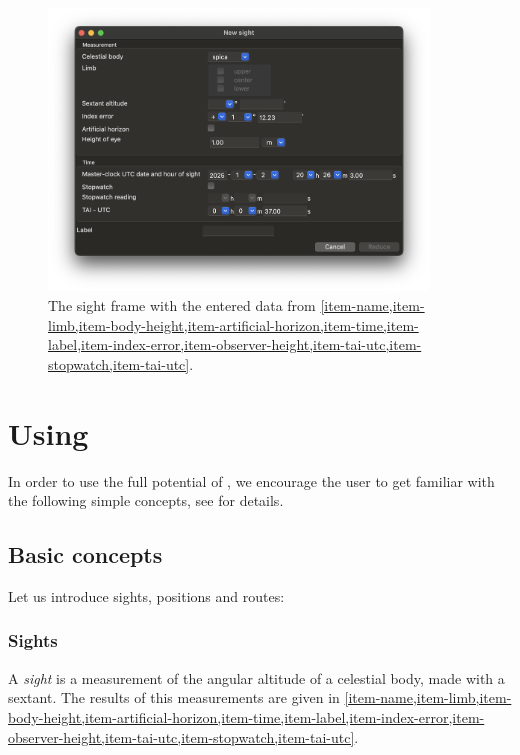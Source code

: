 \documentclass{ol-softwaremanual}
\begin{document}
  \begin{figure}
    \centering
    \includegraphics[width=0.9\textwidth]{figures/sight-frame.png}
    \caption{
      \label{fig-sight-frame}
      The sight frame with the entered data from \cref{item-name,item-limb,item-body-height,item-artificial-horizon,item-time,item-label,item-index-error,item-observer-height,item-tai-utc,item-stopwatch,item-tai-utc}. 
    }
  \end{figure}

\section{Using \thel}


In order to use the full potential of \thel, we encourage the user to get familiar with the following simple concepts, see \cite{bowditch2002the} for details. 

\subsection{Basic concepts}

Let us introduce sights, positions and routes: 
\subsubsection{Sights} \label{section-sights} 

A \textit{sight} is a measurement of the angular altitude of a celestial body, made with a sextant. 
The results of this measurements are given in  \cref{item-name,item-limb,item-body-height,item-artificial-horizon,item-time,item-label,item-index-error,item-observer-height,item-tai-utc,item-stopwatch,item-tai-utc}. 
\end{document}
